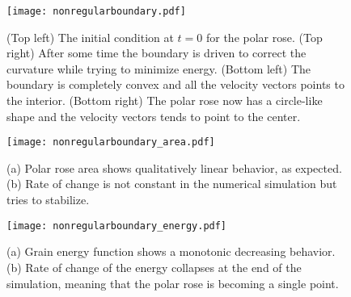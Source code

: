 \begin{figure}[t]
    \centering
    \texttt{[image: nonregularboundary.pdf]}
    \caption[Non-regular boundary evolution]{(Top left) The initial condition at $t=0$ for the polar rose. (Top right) After some time the boundary is driven to correct the curvature while trying to minimize energy. (Bottom left) The boundary is completely convex and all the velocity vectors points to the interior. (Bottom right) The polar rose now has a circle-like shape and the velocity vectors tends to point to the center.}
    \label{fig:nonregularboundary}
\end{figure}



\begin{figure}[t]
    \centering
    \texttt{[image: nonregularboundary\_area.pdf]}
    \subfloat[\label{fig:noncircarea}]{\hspace{.55\linewidth}}
    \subfloat[\label{fig:noncircdAdt}]{\hspace{.45\linewidth}}
    \caption[Non-regular boundary area and rate of change]{(a) Polar rose area shows qualitatively linear behavior, as expected. (b) Rate of change is not constant in the numerical simulation but tries to stabilize.}
    \label{fig:nonregularboundary_area}
\end{figure}

\begin{figure}[t]
    \centering
    \texttt{[image: nonregularboundary\_energy.pdf]}
    \subfloat[\label{fig:noncircenergy}]{\hspace{.55\linewidth}}
    \subfloat[\label{fig:noncircdEdt}]{\hspace{.45\linewidth}}
    \caption[Non-regular boundary energy and rate of change]{(a) Grain energy function shows a monotonic decreasing behavior. (b) Rate of change of the energy collapses at the end of the simulation, meaning that the polar rose is becoming a single point.}
    \label{fig:nonregularboundary_energy}
\end{figure}